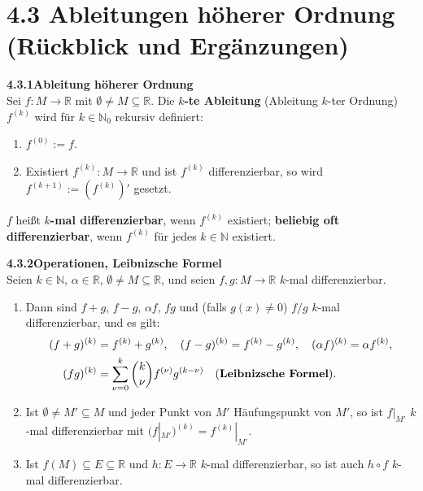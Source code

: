 \documentclass[a4paper,12pt]{article}
\newcommand{\gentry}[3]{%
  \noindent\textbf{#1\quad #2}\nopagebreak\\[0.2em]
  #3\par\smallskip
}
\begin{document}
\section*{4.3 \quad Ableitungen höherer Ordnung (Rückblick und Ergänzungen)}

\gentry{4.3.1}{Ableitung höherer Ordnung}{%
  Sei $f: M \to \mathbb{R}$ mit $\emptyset \neq M \subseteq \mathbb{R}$. Die
  \textbf{$k$-te Ableitung} (Ableitung $k$-ter Ordnung) $f^{(k)}$ wird für $k \in \mathbb{N}_0$
  rekursiv definiert:
  \begin{enumerate}[label=(\roman*),topsep=2pt,itemsep=1pt]
    \item $f^{(0)} := f$.
    \item Existiert $f^{(k)}: M \to \mathbb{R}$ und ist $f^{(k)}$ differenzierbar, so wird
          $f^{(k+1)} := (f^{(k)})'$ gesetzt.
  \end{enumerate}
  $f$ heißt \textbf{$k$-mal differenzierbar}, wenn $f^{(k)}$ existiert;
  \textbf{beliebig oft differenzierbar}, wenn $f^{(k)}$ für jedes $k \in \mathbb{N}$ existiert.
}

\gentry{4.3.2}{Operationen, Leibnizsche Formel}{%
  Seien $k \in \mathbb{N}$, $\alpha \in \mathbb{R}$, $\emptyset \neq M \subseteq \mathbb{R}$,
  und seien $f, g: M \to \mathbb{R}$ $k$-mal differenzierbar.
  \begin{enumerate}[label=(\roman*),topsep=2pt,itemsep=1pt]
    \item Dann sind $f+g$, $f-g$, $\alpha f$, $fg$ und (falls $g(x) \neq 0$) $f/g$ $k$-mal
          differenzierbar, und es gilt:
          \begin{align*}
            (f+g)^{(k)} &= f^{(k)} + g^{(k)}, \quad (f-g)^{(k)} = f^{(k)} - g^{(k)}, \quad (\alpha f)^{(k)} = \alpha f^{(k)},\\
            (fg)^{(k)} &= \sum_{\nu=0}^{k} \binom{k}{\nu} f^{(\nu)} g^{(k-\nu)} \quad \text{(\textbf{Leibnizsche Formel})}.
          \end{align*}
    \item Ist $\emptyset \neq M' \subseteq M$ und jeder Punkt von $M'$ Häufungspunkt von $M'$,
          so ist $f|_{M'}$ $k$-mal differenzierbar mit $(f|_{M'})^{(k)} = f^{(k)}|_{M'}$.
    \item Ist $f(M) \subseteq E \subseteq \mathbb{R}$ und $h: E \to \mathbb{R}$ $k$-mal
          differenzierbar, so ist auch $h \circ f$ $k$-mal differenzierbar.
  \end{enumerate}
}
\end{document}

